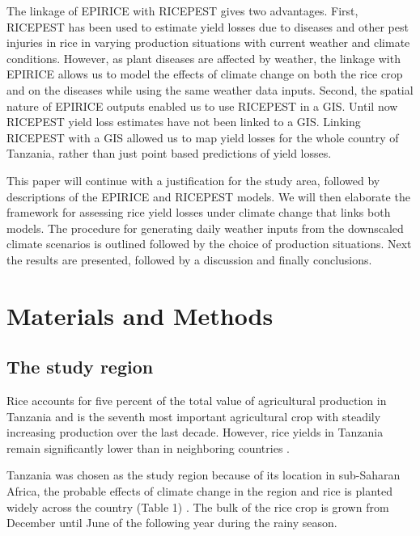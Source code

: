 \documentclass[preprint,review,12pt]{elsarticle}
\begin{document}
    The linkage of EPIRICE with RICEPEST gives two advantages. First, RICEPEST has been used to estimate yield losses due to diseases and other pest injuries in rice in varying production situations with current weather and climate conditions. However, as plant diseases are affected by weather, the linkage with EPIRICE allows us to model the effects of climate change on both the rice crop and on the diseases while using the same weather data inputs. Second, the spatial nature of EPIRICE outputs enabled us to use RICEPEST in a GIS. Until now RICEPEST yield loss estimates have not been linked to a GIS. Linking RICEPEST with a GIS allowed us to map yield losses for the whole country of Tanzania, rather than just point based predictions of yield losses.
    
    This paper will continue with a justification for the study area, followed by descriptions of the EPIRICE and RICEPEST models. We will then elaborate the framework for assessing rice yield losses under climate change that links both models. The procedure for generating daily weather inputs from the downscaled climate scenarios is outlined followed by the choice of production situations. Next the results are presented, followed by a discussion and finally conclusions.
    
    \section{Materials and Methods}
    
    
    \subsection{The study region}
        Rice accounts for five percent of the total value of agricultural production in Tanzania and is the seventh most important agricultural crop with steadily increasing production over the last decade. However, rice yields in Tanzania remain significantly lower than in neighboring countries \cite{Barreiro-Hurle2012}.
    
    Tanzania was chosen as the study region because of its location in sub-Saharan Africa, the probable effects of climate change in the region and rice is planted widely across the country  (Table 1) \cite{Rowhani2011}. The bulk of the rice crop is grown from December until June of the following year during the rainy season. 
    
\end{document}

